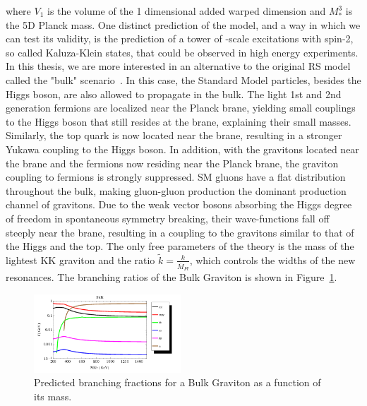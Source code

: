 where $V_1$ is the volume of the 1 dimensional added warped dimension and $M_*^3$ is the 5D Planck mass.
One distinct prediction of the model, and a way in which we can test its validity, is the prediction of a tower of \TeV-scale excitations with spin-2, so called Kaluza-Klein states, that could be observed in high energy experiments. \newline
In this thesis, we are more interested in an alternative to the original RS model called the "bulk" scenario~\cite{PhysRevD.76.036006,Fitzpatrick:2007qr}. In this case, the Standard Model particles, besides the Higgs boson, are also allowed to propagate in the bulk. The light 1st and 2nd generation fermions are localized near the Planck brane, yielding small couplings to the Higgs boson that still resides at the \TeV brane, explaining their small masses. Similarly, the top quark is now located near the \TeV brane, resulting in a stronger Yukawa coupling to the Higgs boson. In addition, with the gravitons located near the \TeV brane and the fermions now residing near the Planck brane, the graviton coupling to fermions is strongly suppressed. SM gluons have a flat distribution throughout the bulk, making gluon-gluon production the dominant production channel of gravitons. Due to the weak vector bosons absorbing the Higgs degree of freedom in spontaneous symmetry breaking, their wave-functions fall off steeply near the \TeV brane, resulting in a coupling to the gravitons similar to that of the Higgs and the top. The only free parameters of the theory is the mass of the lightest KK graviton and the ratio $\tilde{k} = \frac{k}{\bar{M}_{Pl}}$, which controls the widths of the new resonances. The branching ratios of the Bulk Graviton is shown in Figure~\ref{fig:theory:bulk}.
\begin{figure}[h!]
\centering
\includegraphics[width=0.49\textwidth]{figures/theory/BulkGravitonBR_tuomas.png}
\caption{Predicted branching fractions for a Bulk Graviton as a function of its mass.}
\label{fig:theory:bulk}
\end{figure}

